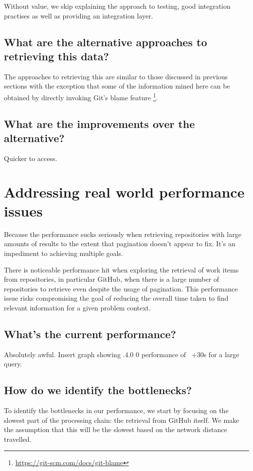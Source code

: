 Without value, we skip explaining the approach to testing, good integration practises as well as providing an integration layer.

\subsection{What are the alternative approaches to retrieving this data?}

The approaches to retrieving this are similar to those discussed in previous sections with the exception that some of the information mined here can be obtained by directly invoking Git's blame feature \footnote{\url{https://git-scm.com/docs/git-blame}}.

\subsection{What are the improvements over the alternative?}

Quicker to access.

\section{Addressing real world performance issues}

Because the performance sucks seriously when retrieving repositories with large amounts of results to the extent that pagination doesn't appear to fix. It's an impediment to achieving multiple goals.

There is noticeable performance hit when exploring the retrieval of work items from repositories, in particular GitHub, when there is a large number of repositories to retrieve even despite the usage of pagination. This performance issue risks compromising the goal of reducing the overall time taken to find relevant information for a given problem context.

\subsection{What's the current performance?}

Absolutely awful. Insert graph showing .4.0 0 performance of ~+30s for a large query.

\subsection{How do we identify the bottlenecks?}

To identify the bottlenecks in our performance, we start by focusing on the slowest part of the processing chain: the retrieval from GitHub itself. We make the assumption that this will be the slowest based on the network distance travelled.


